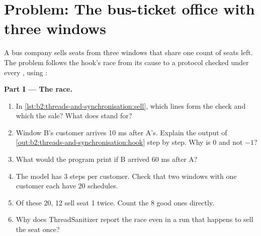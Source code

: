 \section{Problem: The bus-ticket office with three windows}\label{sec:b2:threads-and-synchronisation:problem}

\begin{problem}\label{pb:b2:threads-and-synchronisation:1}
A bus company sells seats from three windows that share one count of seats left. The problem follows the hook's
race from its cause to a protocol checked under every , using :


\label{out:b2:threads-and-synchronisation:office}

\medskip\noindent\textbf{Part I --- The race.}\par\nopagebreak
\begin{enumerate}
\item In \cref{lst:b2:threads-and-synchronisation:sell}, which lines form the check and which the sale? What does
 stand for?
\item Window B's customer arrives 10 ms after A's. Explain the output of \cref{out:b2:threads-and-synchronisation:hook}
step by step. Why is  0 and not $-1$?
\item What would the program print if B arrived 60 ms after A?
\item The model  has 3 steps per customer. Check that two windows with one customer each have 20
schedules.
\item Of these 20, 12 sell seat 1 twice. Count the 8 good ones directly.
\item Why does ThreadSanitizer report the race even in a run that happens to sell the seat once?
\end{enumerate}


\end{problem}
